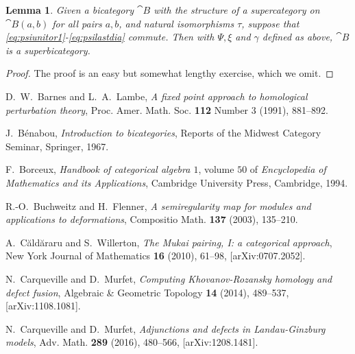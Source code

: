 \documentclass[english,letter paper,12pt,leqno]{article}
\newtheorem{lemma}[theorem]{Lemma}
\theoremstyle{example}
\numberwithin{equation}{section}
\begin{document}
\begin{lemma}\label{lemma:constructingsuper}
Given a bicategory $\cat{B}$ with the structure of a supercategory on $\cat{B}(a,b)$ for all pairs $a,b$, and natural isomorphisms $\tau$, suppose that \eqref{eq:psiunitor1}-\eqref{eq:psilastdia} commute. Then with $\Psi, \xi$ and $\gamma$ defined as above, $\cat{B}$ is a superbicategory.
\end{lemma}
\begin{proof}
The proof is an easy but somewhat lengthy exercise, which we omit.
\end{proof}


\providecommand{\bysame}{\leavevmode\hbox to3em{\hrulefill}\thinspace}
\providecommand{\href}[2]{#2}
\begin{thebibliography}{BHLS03}


D.~W.~Barnes and L.~A.~Lambe, \emph{A fixed point approach to homological perturbation theory}, Proc. Amer.
  Math. Soc. \textbf{112} Number 3 (1991), 881--892.

J.~B\'{e}nabou, \textsl{Introduction to bicategories}, Reports of the Midwest Category Seminar, Springer, 1967.

F.~Borceux, \textsl{Handbook of categorical algebra $1$}, volume $50$ of \textsl{Encyclopedia of Mathematics and its Applications}, Cambridge University Press, Cambridge, 1994.

R.-O.~Buchweitz and H.~Flenner, \textsl{A semiregularity map for modules and applications to deformations}, Compositio Math. \textbf{137} (2003), 135--210.
    
A.~{C\u ald\u araru} and S.~Willerton, \textsl{The Mukai pairing, I: a categorical approach},
New York Journal of Mathematics \textbf{16} (2010), 61--98, 
  \href{http://arxiv.org/abs/0707.2052}{[arXiv:0707.2052]}.

N.~Carqueville and D.~Murfet, \textsl{Computing {K}hovanov-{R}ozansky homology and defect fusion}, Algebraic \& Geometric Topology \textbf{14} (2014), 489--537, \href{http://arxiv.org/abs/1108.1081}{[arXiv:1108.1081]}. 

N.~Carqueville and D.~Murfet, \textsl{Adjunctions and defects in {L}andau-{G}inzburg models}, Adv. Math. \textbf{289} (2016), 480--566, \href{http://arxiv.org/abs/1208.1481}{[arXiv:1208.1481]}.


\end{thebibliography}
\end{document}
